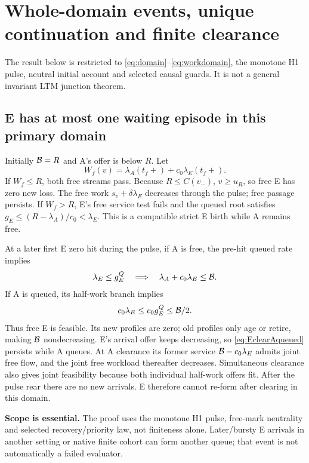 \section{Whole-domain events, unique continuation and finite clearance}
\label{sec:global}
The result below is restricted to \eqref{eq:domain}--\eqref{eq:workdomain},
the monotone H1 pulse, neutral initial account and selected causal guards.
It is not a general invariant LTM junction theorem.

\subsection{E has at most one waiting episode in this primary domain}
Initially $\mathcal B=R$ and A's offer is below $R$. Let
\begin{equation}
 W_f(v)=\lambda_A(t_f+)+c_0\lambda_E(t_f+). \label{eq:frontwork}
\end{equation}
If $W_f\leq R$, both free streams pass. Because $R\leq C(v_-)$,
$v\geq u_R$, so free E has zero new loss. The free work
$s_v+\delta\lambda_E$ decreases through the pulse; free passage persists.
If $W_f>R$, E's free service test fails and the queued root satisfies
$g_E\leq(R-\lambda_A)/c_0<\lambda_E$. This is a compatible strict
E birth while A remains free.

At a later first E zero hit during the pulse, if A is free, the pre-hit
queued rate implies
\begin{equation}
 \lambda_E\leq g_E^Q\quad\Longrightarrow\quad
 \lambda_A+c_0\lambda_E\leq\mathcal B. \label{eq:EclearAfree}
\end{equation}
If A is queued, its half-work branch implies
\begin{equation}
 c_0\lambda_E\leq c_0g_E^Q\leq\mathcal B/2. \label{eq:EclearAqueued}
\end{equation}
Thus free E is feasible. Its new profiles are zero; old profiles only age
or retire, making $\mathcal B$ nondecreasing. E's arrival offer keeps
decreasing, so \eqref{eq:EclearAqueued} persists while A queues. At A
clearance its former service $\mathcal B-c_0\lambda_E$ admits joint free
flow, and the joint free workload thereafter decreases. Simultaneous
clearance also gives joint feasibility because both individual half-work
offers fit. After the pulse rear there are no new arrivals. E therefore
cannot re-form after clearing in this domain.

\textbf{Scope is essential.} The proof uses the monotone H1 pulse,
free-mark neutrality and selected recovery/priority law, not finiteness
alone. Later/bursty E arrivals in another setting or native finite cohort
can form another queue; that event is not automatically a failed evaluator.

